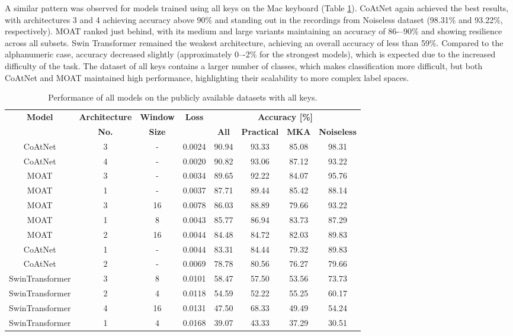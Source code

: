\documentclass[a4paper,11pt,twoside]{report}
\theoremstyle{definition}
\begin{document}
A similar pattern was observed for models trained using all keys on the Mac keyboard (Table \ref{tab:all_keys_clean_results}). CoAtNet again achieved the best results, with architectures 3 and 4 achieving accuracy above 90\% and standing out in the recordings from Noiseless dataset (98.31\% and 93.22\%, respectively). MOAT ranked just behind, with its medium and large variants maintaining an accuracy of 86-–90\% and showing resilience across all subsets. Swin Transformer remained the weakest architecture, achieving an overall accuracy of less than 59\%. Compared to the alphanumeric case, accuracy decreased slightly (approximately 0–-2\% for the strongest models), which is expected due to the increased difficulty of the task. The dataset of all keys contains a larger number of classes, which makes classification more difficult, but both CoAtNet and MOAT maintained high performance, highlighting their scalability to more complex label spaces.


\begin{table}[h!]
\centering
\caption{Performance of all models on the publicly available datasets with all keys.}
\begin{adjustbox}{max width=\textwidth}
\begin{tabular}{c|c|c|c|cccc}
\hline
\textbf{Model} & \textbf{Architecture} & \textbf{Window} & \textbf{Loss} & \multicolumn{4}{c}{\textbf{Accuracy [\%]}} \\
\cline{5-8}
       &   \textbf{No.}  & \textbf{Size}&        & \textbf{All} & \textbf{Practical} & \textbf{MKA} & \textbf{Noiseless}  \\
\hline
CoAtNet & 3 & - & 0.0024 & 90.94 & 93.33 & 85.08 & 98.31  \\
CoAtNet & 4 & - & 0.0020 & 90.82 & 93.06 & 87.12 & 93.22  \\
MOAT & 3 & - & 0.0034 & 89.65 & 92.22 & 84.07 & 95.76  \\
MOAT & 1 & - & 0.0037 & 87.71 & 89.44 & 85.42 & 88.14  \\
MOAT & 3 & 16 & 0.0078 & 86.03 & 88.89 & 79.66 & 93.22  \\
MOAT & 1 & 8 & 0.0043 & 85.77 & 86.94 & 83.73 & 87.29  \\
MOAT & 2 & 16 & 0.0044 & 84.48 & 84.72 & 82.03 & 89.83  \\
CoAtNet & 1 & - & 0.0044 & 83.31 & 84.44 & 79.32 & 89.83  \\
CoAtNet & 2 & - & 0.0069 & 78.78 & 80.56 & 76.27 & 79.66  \\
SwinTransformer & 3 & 8 & 0.0101 & 58.47 & 57.50 & 53.56 & 73.73  \\
SwinTransformer & 2 & 4 & 0.0118 & 54.59 & 52.22 & 55.25 & 60.17  \\
SwinTransformer & 4 & 16 & 0.0131 & 47.50 & 68.33 & 49.49 & 54.24  \\
SwinTransformer & 1 & 4 & 0.0168 & 39.07 & 43.33 & 37.29 & 30.51  \\

\hline
\end{tabular}
\end{adjustbox}
\label{tab:all_keys_clean_results}
\end{table}
\end{document}
